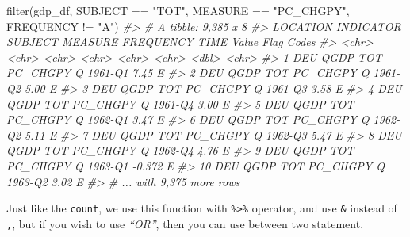 \documentclass[
]{article}
\newenvironment{Shaded}{\begin{snugshade}}{\end{snugshade}}
\newcommand{\CommentTok}[1]{\textcolor[rgb]{0.56,0.35,0.01}{\textit{#1}}}
\newcommand{\FunctionTok}[1]{\textcolor[rgb]{0.00,0.00,0.00}{#1}}
\newcommand{\NormalTok}[1]{#1}
\newcommand{\SpecialCharTok}[1]{\textcolor[rgb]{0.00,0.00,0.00}{#1}}
\newcommand{\StringTok}[1]{\textcolor[rgb]{0.31,0.60,0.02}{#1}}
\begin{document}
\begin{Shaded}
\begin{Highlighting}[]
\FunctionTok{filter}\NormalTok{(gdp\_df, SUBJECT }\SpecialCharTok{==} \StringTok{"TOT"}\NormalTok{, MEASURE }\SpecialCharTok{==} \StringTok{"PC\_CHGPY"}\NormalTok{, FREQUENCY }\SpecialCharTok{!=} \StringTok{"A"}\NormalTok{)}
\CommentTok{\#\textgreater{} \# A tibble: 9,385 x 8}
\CommentTok{\#\textgreater{}    LOCATION INDICATOR SUBJECT MEASURE  FREQUENCY TIME     Value \textasciigrave{}Flag Codes\textasciigrave{}}
\CommentTok{\#\textgreater{}    \textless{}chr\textgreater{}    \textless{}chr\textgreater{}     \textless{}chr\textgreater{}   \textless{}chr\textgreater{}    \textless{}chr\textgreater{}     \textless{}chr\textgreater{}    \textless{}dbl\textgreater{} \textless{}chr\textgreater{}       }
\CommentTok{\#\textgreater{}  1 DEU      QGDP      TOT     PC\_CHGPY Q         1961{-}Q1  7.45  E           }
\CommentTok{\#\textgreater{}  2 DEU      QGDP      TOT     PC\_CHGPY Q         1961{-}Q2  5.00  E           }
\CommentTok{\#\textgreater{}  3 DEU      QGDP      TOT     PC\_CHGPY Q         1961{-}Q3  3.58  E           }
\CommentTok{\#\textgreater{}  4 DEU      QGDP      TOT     PC\_CHGPY Q         1961{-}Q4  3.00  E           }
\CommentTok{\#\textgreater{}  5 DEU      QGDP      TOT     PC\_CHGPY Q         1962{-}Q1  3.47  E           }
\CommentTok{\#\textgreater{}  6 DEU      QGDP      TOT     PC\_CHGPY Q         1962{-}Q2  5.11  E           }
\CommentTok{\#\textgreater{}  7 DEU      QGDP      TOT     PC\_CHGPY Q         1962{-}Q3  5.47  E           }
\CommentTok{\#\textgreater{}  8 DEU      QGDP      TOT     PC\_CHGPY Q         1962{-}Q4  4.76  E           }
\CommentTok{\#\textgreater{}  9 DEU      QGDP      TOT     PC\_CHGPY Q         1963{-}Q1 {-}0.372 E           }
\CommentTok{\#\textgreater{} 10 DEU      QGDP      TOT     PC\_CHGPY Q         1963{-}Q2  3.02  E           }
\CommentTok{\#\textgreater{} \# ... with 9,375 more rows}
\end{Highlighting}
\end{Shaded}

Just like the \texttt{count}, we use this function with \texttt{\%\textgreater{}\%} operator, and use \texttt{\&} instead of \texttt{,}, but if you wish to use \emph{``OR''}, then you can use \texttt{\textbar{}} between two statement.
\end{document}
